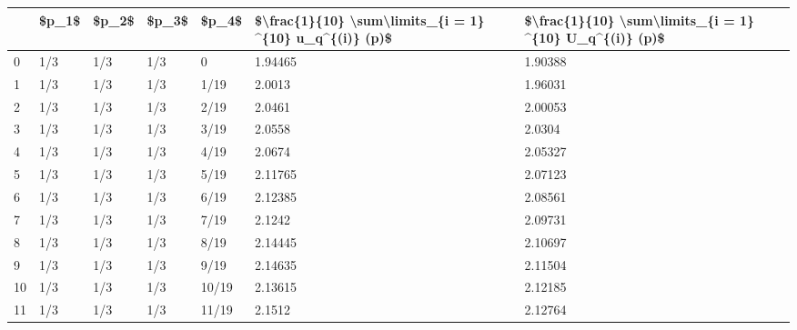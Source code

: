 \begin{tabular}{lllllll}
\toprule
{} & \$p\_1\$ & \$p\_2\$ & \$p\_3\$ &  \$p\_4\$ & \$\textbackslash frac\{1\}\{10\} \textbackslash sum\textbackslash limits\_\{i = 1\} \textasciicircum  \{10\} u\_q\textasciicircum \{(i)\} (p)\$ & \$\textbackslash frac\{1\}\{10\} \textbackslash sum\textbackslash limits\_\{i = 1\} \textasciicircum  \{10\} U\_q\textasciicircum \{(i)\} (p)\$ \\
\midrule
0  &   1/3 &   1/3 &   1/3 &      0 &                                            1.94465 &                                            1.90388 \\
1  &   1/3 &   1/3 &   1/3 &   1/19 &                                             2.0013 &                                            1.96031 \\
2  &   1/3 &   1/3 &   1/3 &   2/19 &                                             2.0461 &                                            2.00053 \\
3  &   1/3 &   1/3 &   1/3 &   3/19 &                                             2.0558 &                                             2.0304 \\
4  &   1/3 &   1/3 &   1/3 &   4/19 &                                             2.0674 &                                            2.05327 \\
5  &   1/3 &   1/3 &   1/3 &   5/19 &                                            2.11765 &                                            2.07123 \\
6  &   1/3 &   1/3 &   1/3 &   6/19 &                                            2.12385 &                                            2.08561 \\
7  &   1/3 &   1/3 &   1/3 &   7/19 &                                             2.1242 &                                            2.09731 \\
8  &   1/3 &   1/3 &   1/3 &   8/19 &                                            2.14445 &                                            2.10697 \\
9  &   1/3 &   1/3 &   1/3 &   9/19 &                                            2.14635 &                                            2.11504 \\
10 &   1/3 &   1/3 &   1/3 &  10/19 &                                            2.13615 &                                            2.12185 \\
11 &   1/3 &   1/3 &   1/3 &  11/19 &                                             2.1512 &                                            2.12764 \\

\end{tabular}
